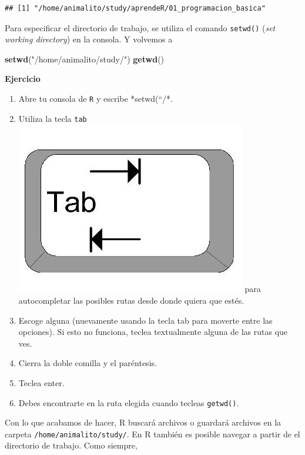 \documentclass[]{article}
\newenvironment{Shaded}{\begin{snugshade}}{\end{snugshade}}
\newcommand{\KeywordTok}[1]{\textcolor[rgb]{0.13,0.29,0.53}{\textbf{#1}}}
\newcommand{\StringTok}[1]{\textcolor[rgb]{0.31,0.60,0.02}{#1}}
\newcommand{\NormalTok}[1]{#1}
\providecommand{\tightlist}{%
  \setlength{\itemsep}{0pt}\setlength{\parskip}{0pt}}
\begin{document}
\begin{verbatim}
## [1] "/home/animalito/study/aprendeR/01_programacion_basica"
\end{verbatim}

Para especificar el directorio de trabajo, se utiliza el comando
\texttt{setwd()} (\emph{set working directory}) en la consola. Y
volvemos a

\begin{Shaded}
\begin{Highlighting}[]
\KeywordTok{setwd}\NormalTok{(}\StringTok{"/home/animalito/study/"}\NormalTok{)}
\KeywordTok{getwd}\NormalTok{()}
\end{Highlighting}
\end{Shaded}

\textbf{Ejercicio}

\begin{enumerate}
\def\labelenumi{\arabic{enumi}.}
\tightlist
\item
  Abre tu consola de \texttt{R} y escribe *setwd(``/*.
\item
  Utiliza la tecla \texttt{tab}
  \includegraphics[scale=0.5]{../img/tab_key.jpg} para autocompletar las
  posibles rutas desde donde quiera que estés.
\item
  Escoge alguna (nuevamente usando la tecla tab para moverte entre las
  opciones). Si esto no funciona, teclea textualmente alguna de las
  rutas que ves.
\item
  Cierra la doble comilla y el paréntesis.
\item
  Teclea enter.
\item
  Debes encontrarte en la ruta elegida cuando tecleas \texttt{getwd()}.
\end{enumerate}

Con lo que acabamos de hacer, R buscará archivos o guardará archivos en
la carpeta \texttt{/home/animalito/study/}. En R también es posible
navegar a partir de el directorio de trabajo. Como siempre,
\end{document}
